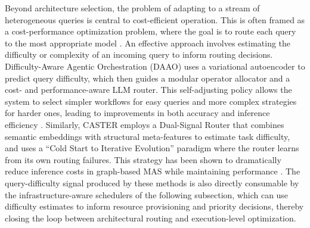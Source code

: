 \documentclass[11pt]{article}
\begin{document}
Beyond architecture selection, the problem of adapting to a stream of heterogeneous queries is central to cost-efficient operation. This is often framed as a cost-performance optimization problem, where the goal is to route each query to the most appropriate model \cite{ref282}. An effective approach involves estimating the difficulty or complexity of an incoming query to inform routing decisions. Difficulty-Aware Agentic Orchestration (DAAO) uses a variational autoencoder to predict query difficulty, which then guides a modular operator allocator and a cost- and performance-aware LLM router. This self-adjusting policy allows the system to select simpler workflows for easy queries and more complex strategies for harder ones, leading to improvements in both accuracy and inference efficiency \cite{ref283}. Similarly, CASTER employs a Dual-Signal Router that combines semantic embeddings with structural meta-features to estimate task difficulty, and uses a ``Cold Start to Iterative Evolution'' paradigm where the router learns from its own routing failures. This strategy has been shown to dramatically reduce inference costs in graph-based MAS while maintaining performance \cite{ref284}. The query-difficulty signal produced by these methods is also directly consumable by the infrastructure-aware schedulers of the following subsection, which can use difficulty estimates to inform resource provisioning and priority decisions, thereby closing the loop between architectural routing and execution-level optimization.
\end{document}
